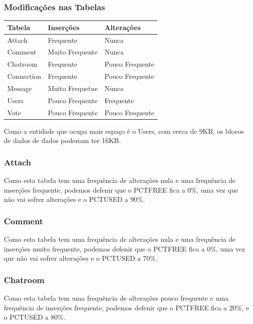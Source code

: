 \documentclass[a4paper, 12pt]{article}
\begin{document}
\subsubsection{Modificações nas Tabelas}
\begin{center}
    \begin{tabular}{|p{4cm} | p{4cm} | p{4cm} |} \hline
        \textbf{Tabela}          &   \textbf{Inserções}      &   \textbf{Alterações}       \\ \hline
        Attach          &     Frequente    &   Nunca            \\ \hline
        Comment         &   Muito Frequente&   Nunca            \\ \hline
        Chatroom        &   Frequente      &   Pouco Frequente  \\ \hline
        Connection      &   Frequente      &   Pouco Frequente  \\ \hline
        Message         &   Muito Frequetne&   Nunca            \\ \hline
        Users           &   Pouco Frequente&   Frequente        \\ \hline
        Vote            &   Pouco Frequente&   Pouco Frequente  \\ \hline
    \end{tabular}
\end{center}

Como a entidade que ocupa mais espaço é o Users, com cerca de 9KB, os blocos de dados de dados poderiam ter 16KB.

\subsubsection{Attach}
\indent \indent Como esta tabela tem uma frequência de alterações nula e uma frequência de inserções frequente, podemos defenir que o PCTFREE fica a 0\%, uma vez que não vai sofrer alterações e o PCTUSED a 90\%.

\subsubsection{Comment}
\indent \indent Como esta tabela tem uma frequência de alterações nula e uma frequência de inserções muito frequente, podemos defenir que o PCTFREE fica a 0\%, uma vez que não vai sofrer alterações e o PCTUSED a 70\%.

\subsubsection{Chatroom}
\indent \indent Como esta tabela tem uma frequência de alterações pouco frequente e uma frequência de inserções frequente, podemos defenir que o PCTFREE fica a 20\%, e o PCTUSED a 80\%.
\end{document}
